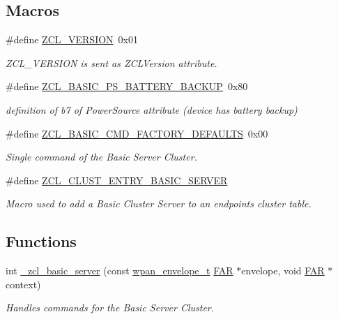 \subsection*{Macros}
\begin{DoxyCompactItemize}
\item 
\#define \hyperlink{group__zcl__basic_ga677e87e13981dedcd3b370ede4902c54}{Z\+C\+L\+\_\+\+V\+E\+R\+S\+I\+ON}~0x01
\begin{DoxyCompactList}\small\item\em Z\+C\+L\+\_\+\+V\+E\+R\+S\+I\+ON is sent as Z\+C\+L\+Version attribute. \end{DoxyCompactList}\item 
\mbox{\label{group__zcl__basic_ga41f5febaea65227af827ca59f30a422b}} 
\#define \hyperlink{group__zcl__basic_ga41f5febaea65227af827ca59f30a422b}{Z\+C\+L\+\_\+\+B\+A\+S\+I\+C\+\_\+\+P\+S\+\_\+\+B\+A\+T\+T\+E\+R\+Y\+\_\+\+B\+A\+C\+K\+UP}~0x80
\begin{DoxyCompactList}\small\item\em definition of b7 of Power\+Source attribute (device has battery backup) \end{DoxyCompactList}\item 
\mbox{\label{group__zcl__basic_ga3b8f5b3fdcb292179c3b8118ee142e07}} 
\#define \hyperlink{group__zcl__basic_ga3b8f5b3fdcb292179c3b8118ee142e07}{Z\+C\+L\+\_\+\+B\+A\+S\+I\+C\+\_\+\+C\+M\+D\+\_\+\+F\+A\+C\+T\+O\+R\+Y\+\_\+\+D\+E\+F\+A\+U\+L\+TS}~0x00
\begin{DoxyCompactList}\small\item\em Single command of the Basic Server Cluster. \end{DoxyCompactList}\item 
\#define \hyperlink{group__zcl__basic_gad8336fcfc2729c8deb86eda7f125f271}{Z\+C\+L\+\_\+\+C\+L\+U\+S\+T\+\_\+\+E\+N\+T\+R\+Y\+\_\+\+B\+A\+S\+I\+C\+\_\+\+S\+E\+R\+V\+ER}
\begin{DoxyCompactList}\small\item\em Macro used to add a Basic Cluster Server to an endpoint\textquotesingle{}s cluster table. \end{DoxyCompactList}\end{DoxyCompactItemize}
\subsection*{Functions}
\begin{DoxyCompactItemize}
\item 
int \hyperlink{group__zcl__basic_ga3a10395a400ea91bf9a3c37dcda69085}{\+\_\+zcl\+\_\+basic\+\_\+server} (const \hyperlink{structwpan__envelope__t}{wpan\+\_\+envelope\+\_\+t} \hyperlink{group__hal_gaef060b3456fdcc093a7210a762d5f2ed}{F\+AR} $\ast$envelope, void \hyperlink{group__hal_gaef060b3456fdcc093a7210a762d5f2ed}{F\+AR} $\ast$context)
\begin{DoxyCompactList}\small\item\em Handles commands for the Basic Server Cluster. \end{DoxyCompactList}\end{DoxyCompactItemize}
